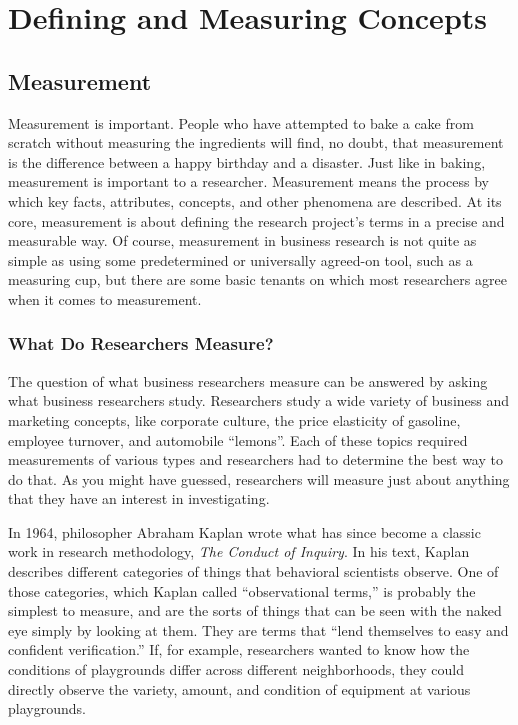 \chapter{Defining and Measuring Concepts}\label{ch05:measuring}

\section{Measurement}

Measurement is important. People who have attempted to bake a cake from scratch without measuring the ingredients will find, no doubt, that measurement is the difference between a happy birthday and a disaster. Just like in baking, measurement is important to a researcher. Measurement means the process by which key facts, attributes, concepts, and other phenomena are described. At its core, measurement is about defining the research project's terms in a precise and measurable way. Of course, measurement in business research is not quite as simple as using some predetermined or universally agreed-on tool, such as a measuring cup, but there are some basic tenants on which most researchers agree when it comes to measurement. 

\subsection{What Do Researchers Measure?}

The question of what business researchers measure can be answered by asking what business researchers study. Researchers study a wide variety of business and marketing concepts, like corporate culture\cite{denison1990corporate}, the price elasticity of gasoline\cite{hughes2006evidence}, employee turnover\cite{hom1995employee}, and automobile ``lemons''\cite{akerlof1978market}. Each of these topics required measurements of various types and researchers had to determine the best way to do that. As you might have guessed, researchers will measure just about anything that they have an interest in investigating. 

In 1964, philosopher Abraham Kaplan wrote what has since become a classic work in research methodology, \textit{The Conduct of Inquiry}\cite{kaplan2017conduct}. In his text, Kaplan describes different categories of things that behavioral scientists observe. One of those categories, which Kaplan called ``observational terms,'' is probably the simplest to measure, and are the sorts of things that can be seen with the naked eye simply by looking at them. They are terms that ``lend themselves to easy and confident verification.'' If, for example, researchers wanted to know how the conditions of playgrounds differ across different neighborhoods, they could directly observe the variety, amount, and condition of equipment at various playgrounds.

